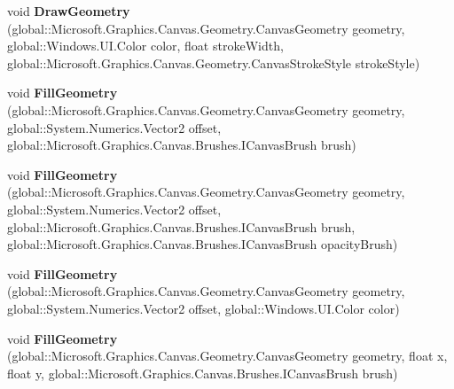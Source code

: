 \begin{DoxyCompactItemize}
\item 
\mbox{\label{interface_microsoft_1_1_graphics_1_1_canvas_1_1_i_canvas_drawing_session_ad5502f42dbe1b86dcf7d7fa937541acb}} 
void {\bfseries Draw\+Geometry} (global\+::\+Microsoft.\+Graphics.\+Canvas.\+Geometry.\+Canvas\+Geometry geometry, global\+::\+Windows.\+U\+I.\+Color color, float stroke\+Width, global\+::\+Microsoft.\+Graphics.\+Canvas.\+Geometry.\+Canvas\+Stroke\+Style stroke\+Style)
\item 
\mbox{\label{interface_microsoft_1_1_graphics_1_1_canvas_1_1_i_canvas_drawing_session_ac7cd0712093d632275d47aa35f415c90}} 
void {\bfseries Fill\+Geometry} (global\+::\+Microsoft.\+Graphics.\+Canvas.\+Geometry.\+Canvas\+Geometry geometry, global\+::\+System.\+Numerics.\+Vector2 offset, global\+::\+Microsoft.\+Graphics.\+Canvas.\+Brushes.\+I\+Canvas\+Brush brush)
\item 
\mbox{\label{interface_microsoft_1_1_graphics_1_1_canvas_1_1_i_canvas_drawing_session_a8e11f86d630ec14be49378fa73e606f4}} 
void {\bfseries Fill\+Geometry} (global\+::\+Microsoft.\+Graphics.\+Canvas.\+Geometry.\+Canvas\+Geometry geometry, global\+::\+System.\+Numerics.\+Vector2 offset, global\+::\+Microsoft.\+Graphics.\+Canvas.\+Brushes.\+I\+Canvas\+Brush brush, global\+::\+Microsoft.\+Graphics.\+Canvas.\+Brushes.\+I\+Canvas\+Brush opacity\+Brush)
\item 
\mbox{\label{interface_microsoft_1_1_graphics_1_1_canvas_1_1_i_canvas_drawing_session_a92c920f0c794ca240e536d0e69a55b36}} 
void {\bfseries Fill\+Geometry} (global\+::\+Microsoft.\+Graphics.\+Canvas.\+Geometry.\+Canvas\+Geometry geometry, global\+::\+System.\+Numerics.\+Vector2 offset, global\+::\+Windows.\+U\+I.\+Color color)
\item 
\mbox{\label{interface_microsoft_1_1_graphics_1_1_canvas_1_1_i_canvas_drawing_session_a07bd3aab9585c05ebbc01dc5e518028e}} 
void {\bfseries Fill\+Geometry} (global\+::\+Microsoft.\+Graphics.\+Canvas.\+Geometry.\+Canvas\+Geometry geometry, float x, float y, global\+::\+Microsoft.\+Graphics.\+Canvas.\+Brushes.\+I\+Canvas\+Brush brush)

\end{DoxyCompactItemize}
